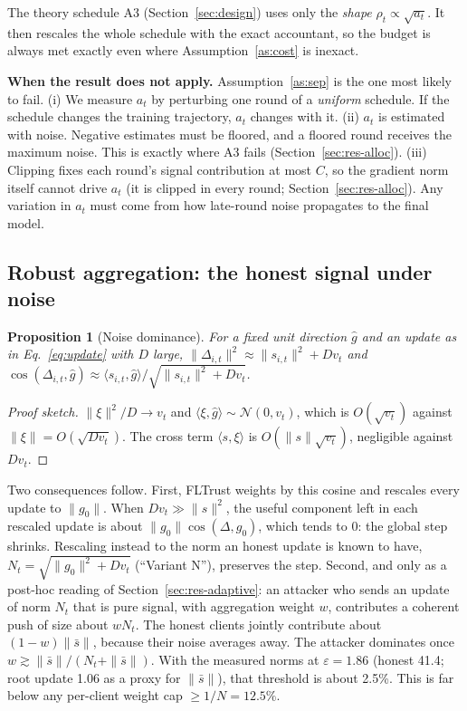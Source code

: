 \documentclass[journal]{IEEEtran}
\newtheorem{proposition}{Proposition}
\newcommand{\eps}{\varepsilon}
\begin{document}
The theory schedule A3 (Section~\ref{sec:design}) uses only the \emph{shape} $\rho_t\propto\sqrt{a_t}$.
It then rescales the whole schedule with the exact accountant, so the budget is always met exactly
even where Assumption~\ref{as:cost} is inexact.

\textbf{When the result does not apply.} Assumption~\ref{as:sep} is the one most likely to fail.
(i) We measure $a_t$ by perturbing one round of a \emph{uniform} schedule. If the schedule changes the
training trajectory, $a_t$ changes with it. (ii) $a_t$ is estimated with noise. Negative estimates
must be floored, and a floored round receives the maximum noise. This is exactly where A3 fails
(Section~\ref{sec:res-alloc}). (iii) Clipping fixes each round's signal contribution at most $C$,
so the gradient norm itself cannot drive $a_t$ (it is clipped in every round; Section~\ref{sec:res-alloc}).
Any variation in $a_t$ must come from how late-round noise propagates to the final model.

\subsection{Robust aggregation: the honest signal under noise}
\begin{proposition}[Noise dominance]\label{prop:noise}
For a fixed unit direction $\hat g$ and an update as in Eq.~\eqref{eq:update} with $D$ large,
$\|\Delta_{i,t}\|^2 \approx \|s_{i,t}\|^2 + D v_t$ and
$\cos(\Delta_{i,t}, \hat g) \approx \langle s_{i,t}, \hat g\rangle / \sqrt{\|s_{i,t}\|^2 + D v_t}$.
\end{proposition}
\begin{proof}[Proof sketch]
$\|\xi\|^2/D \to v_t$ and $\langle \xi, \hat g\rangle \sim \mathcal{N}(0, v_t)$, which is
$O(\sqrt{v_t})$ against $\|\xi\| = O(\sqrt{D v_t})$. The cross term $\langle s, \xi\rangle$ is
$O(\|s\|\sqrt{v_t})$, negligible against $D v_t$.
\end{proof}

Two consequences follow. First, FLTrust weights by this cosine and rescales every update to
$\|g_0\|$. When $D v_t \gg \|s\|^2$, the useful component left in each rescaled update is about
$\|g_0\|\cos(\Delta, g_0)$, which tends to 0: the global step shrinks. Rescaling instead to the norm
an honest update is known to have, $N_t = \sqrt{\|g_0\|^2 + D v_t}$ (``Variant N''), preserves the
step. Second, and only as a post-hoc reading of Section~\ref{sec:res-adaptive}: an attacker who sends
an update of norm $N_t$ that is pure signal, with aggregation weight $w$, contributes a coherent push
of size about $wN_t$. The honest clients jointly contribute about $(1-w)\|\bar s\|$, because their
noise averages away. The attacker dominates once $w \gtrsim \|\bar s\|/(N_t + \|\bar s\|)$. With the
measured norms at $\eps = 1.86$ (honest 41.4; root update 1.06 as a proxy for $\|\bar s\|$), that
threshold is about 2.5\%. This is far below any per-client weight cap $\ge 1/N = 12.5\%$.
\end{document}
